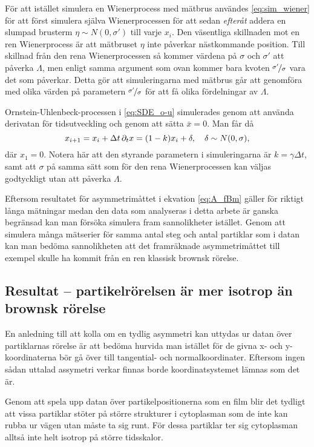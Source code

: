 För att istället simulera en Wienerprocess med mätbrus användes \eqref{eq:sim_wiener} för att först simulera själva Wienerprocessen för att sedan \emph{efteråt} addera en slumpad brusterm $\eta \sim N(0, \sigma')$ till varje $x_i$. Den väsentliga skillnaden mot en ren Wienerprocess är att mätbruset $\eta$ inte påverkar nästkommande position. Till skillnad från den rena Wienerprocessen så kommer värdena på $\sigma$ och $\sigma'$ att påverka $\varLambda$, men enligt samma argument som ovan kommer bara kvoten $\nicefrac{\sigma'}{\sigma}$ vara det som påverkar. Detta gör att simuleringarna med mätbrus går att genomföra med olika värden på parametern $\nicefrac{\sigma'}{\sigma}$ för att få olika fördelningar av $\varLambda$. 

Ornstein-Uhlenbeck-processen i \eqref{eq:SDE_o-u} simulerades genom att använda derivatan för tidsutveckling och genom att sätta $\bar{x}=0$. Man får då
\begin{equation}
x_{i+1} = x_i + \Delta{t}\,\pd_{t}x  = (1-k) x_i +  \delta 
\qcomma  \delta \sim N(0, \sigma),
\end{equation}
där $x_1=0$. Notera här att den styrande parametern i simuleringarna är $k=\gamma\Delta{t}$, samt att $\sigma$ på samma sätt som för den rena Wienerprocessen kan väljas godtyckligt utan att påverka $\varLambda$. 

Eftersom resultatet för asymmetrimåttet i ekvation \eqref{eq:A_fBm} gäller för riktigt långa mätningar medan den data som analyseras i detta arbete är ganska begränsad kan man försöka simulera fram sannolikheter istället. Genom att simulera många mätserier för samma antal steg och antal partiklar som i datan kan man bedöma sannolikheten att det framräknade asymmetrimåttet till exempel skulle ha kommit från en ren klassisk brownsk rörelse. 

\subsection{Resultat -- partikelrörelsen är mer isotrop än brownsk rörelse}
En anledning till att kolla om en tydlig asymmetri kan uttydas ur datan över partiklarnas rörelse är att bedöma hurvida man istället för de givna x- och y-koordinaterna bör gå över till tangential- och normalkoordinater. Eftersom ingen sådan uttalad assymetri verkar finnas borde koordinatsystemet lämnas som det är.

Genom att spela upp datan över partikelpositionerna som en film blir det tydligt att vissa partiklar stöter på större strukturer i cytoplasman som de inte kan rubba ur vägen utan måste ta sig runt. För dessa partiklar ter sig cytoplasman alltså inte helt isotrop på större tidsskalor. 


